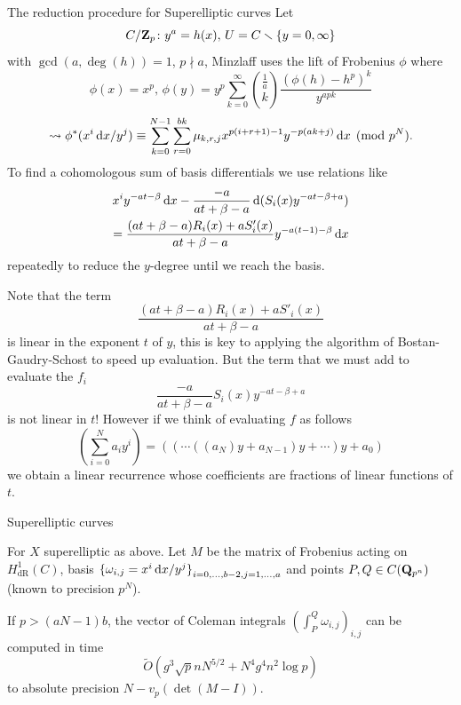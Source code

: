 \begin{frame}{The reduction procedure for Superelliptic curves}
    Let \vspace{-15pt} $$ C/\mathbf{Z}_{p}\colon y^a = h(x),\,U  = C\smallsetminus \{y = 0, \infty \}$$
    with $ \gcd(a,\deg(h)) = 1$, $ p\nmid a$, \pause Minzlaff uses the lift of Frobenius $\phi $ where
    \[ \phi  (x)  = x^p,\, \phi (y)= y^p\sum_{k=0}^\infty \binom{\frac 1a}{k}\frac{(\phi(h)  - h^p)^k}{y^{apk}}\]\pause
    \[\leadsto  \phi ^* (x^i \mathop{}\!\mathrm{d} x /y^j) \equiv  \sum_{k=0}^{N-1} \sum_{r=0}^{bk} \mu _{k,r,j} x^{p(i + r +1)-1} y^{-p(ak + j)} \mathop{}\!\mathrm{d} x \pmod{p^N}\text.\]  \pause
    To find a cohomologous sum of basis differentials we use relations like
    \begin{align*}
        x^{i} y^{-at - \beta}\mathop{}\!\mathrm{d} x -\frac{-a}{at + \beta  - a} \mathop{}\!\mathrm{d}(S_i(x)y^{-at -\beta + a}) \\
        = \frac{(at + \beta - a)R_i(x) + aS'_i(x)}{at + \beta - a} y^{-a(t-1) - \beta} \mathop{}\!\mathrm{d} x
    \end{align*}
    repeatedly to reduce the $y$-degree until we reach the basis.
\end{frame}


\begin{frame}
    Note that the term 
    \[
        \frac{(at + \beta - a)R_i(x) + aS'_i(x)}{at + \beta - a}
    \]
    is linear in the exponent $t$ of $y$, this is key to applying the algorithm of Bostan-Gaudry-Schost to speed up evaluation. \pause
    But the term that we must add to evaluate the $f_i$
    \[\frac{-a}{at + \beta  - a}S_i(x)y^{-at -\beta + a} \]
    is not linear in $t$! \pause
    However if we think of evaluating $f$ as follows
    \[\left(\sum_{i = 0}^N a_i y^i\right)= ((\cdots ((a_N)y + a_{N-1})y  + \cdots)y + a_0)\]
    we obtain a linear recurrence whose coefficients are fractions of linear functions of $t$.


\end{frame}


\begin{frame}{Superelliptic curves}
    \begin{theorem}[B.]
        For $X$ superelliptic as above.
        Let $ M$ be the matrix of Frobenius acting on  $ H^1_\mathrm{dR}(C)$, basis $ {\{\omega_{i,j}= x^i\mathop{}\!\mathrm{d} x /y^j\}}_{i=0,\ldots, b-2,j=1,\ldots,a}$ and points $ P,Q\in C(\mathbf Q_{p^n})$ (known to precision $ p^N$).

        If $ p \gt (aN - 1)b$, the vector of Coleman integrals $\left(\int_P^Q \omega_{i,j}\right)_{i,j}$ can be computed in time 
        $$ \widetilde O\left(g^3 \sqrt{p}n N^{5/2} + N^4 g^4 n^2 \log p \right)$$
        to absolute precision  $ N - v_p(\det(M-I))$.
    \end{theorem}
\end{frame}


